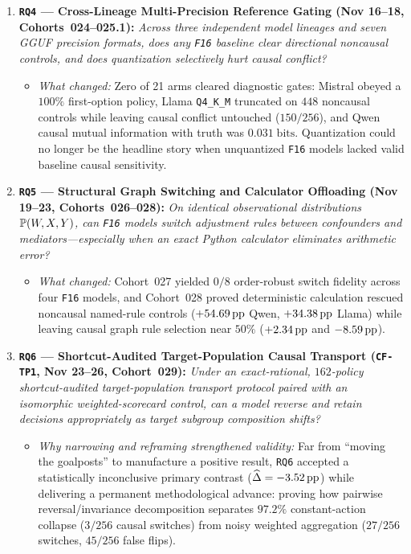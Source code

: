 \begin{enumerate}
  \item \textbf{\texttt{RQ4} --- Cross-Lineage Multi-Precision Reference Gating (Nov 16--18, Cohorts~024--025.1):} \emph{Across three independent model lineages and seven GGUF precision formats, does any \texttt{F16} baseline clear directional noncausal controls, and does quantization selectively hurt causal conflict?}
  \begin{itemize}
    \item \emph{What changed:} Zero of 21 arms cleared diagnostic gates: Mistral obeyed a $100\%$ first-option policy, Llama \texttt{Q4\_K\_M} truncated on $448$ noncausal controls while leaving causal conflict untouched ($150/256$), and Qwen causal mutual information with truth was $0.031\;\text{bits}$. Quantization could no longer be the headline story when unquantized \texttt{F16} models lacked valid baseline causal sensitivity.
  \end{itemize}

  \item \textbf{\texttt{RQ5} --- Structural Graph Switching and Calculator Offloading (Nov 19--23, Cohorts~026--028):} \emph{On identical observational distributions $\mathbb{P}(W,X,Y)$, can \texttt{F16} models switch adjustment rules between confounders and mediators---especially when an exact Python calculator eliminates arithmetic error?}
  \begin{itemize}
    \item \emph{What changed:} Cohort~027 yielded $0/8$ order-robust switch fidelity across four \texttt{F16} models, and Cohort~028 proved deterministic calculation rescued noncausal named-rule controls ($+54.69\,\mathrm{pp}$ Qwen, $+34.38\,\mathrm{pp}$ Llama) while leaving causal graph rule selection near $50\%$ ($+2.34\,\mathrm{pp}$ and $-8.59\,\mathrm{pp}$).
  \end{itemize}

  \item \textbf{\texttt{RQ6} --- Shortcut-Audited Target-Population Causal Transport (\texttt{CF-TP1}, Nov 23--26, Cohort~029):} \emph{Under an exact-rational, $162$-policy shortcut-audited target-population transport protocol paired with an isomorphic weighted-scorecard control, can a model reverse and retain decisions appropriately as target subgroup composition shifts?}
  \begin{itemize}
    \item \emph{Why narrowing and reframing strengthened validity:} Far from ``moving the goalposts'' to manufacture a positive result, \texttt{RQ6} accepted a statistically inconclusive primary contrast ($\widehat{\Delta} = -3.52\,\mathrm{pp}$) while delivering a permanent methodological advance: proving how pairwise reversal/invariance decomposition separates $97.2\%$ constant-action collapse ($3/256$ causal switches) from noisy weighted aggregation ($27/256$ switches, $45/256$ false flips).
  \end{itemize}
\end{enumerate}

